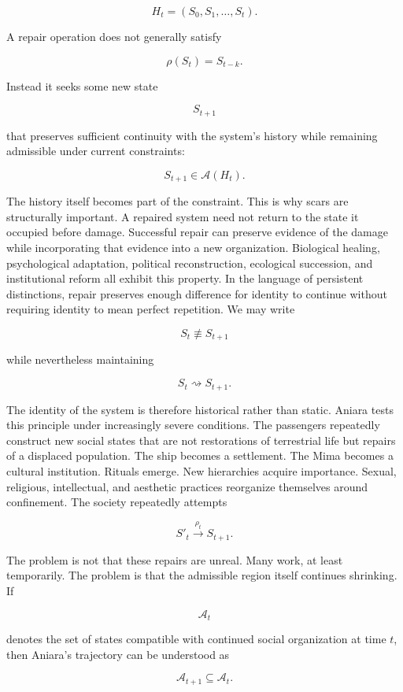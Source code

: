 \documentclass[11pt,oneside]{book}
\theoremstyle{definition}
\theoremstyle{remark}
\begin{document}
\[
H_t=(S_0,S_1,\ldots,S_t).
\]

A repair operation does not generally satisfy

\[
\rho(S_t)=S_{t-k}.
\]

Instead it seeks some new state

\[
S_{t+1}
\]

that preserves sufficient continuity with the system's history while remaining admissible under
current constraints:

\[
S_{t+1}\in \mathcal{A}(H_t).
\]

The history itself becomes part of the constraint. This is why scars are structurally important. A
repaired system need not return to the state it occupied before damage. Successful repair can
preserve evidence of the damage while incorporating that evidence into a new organization.
Biological healing, psychological adaptation, political reconstruction, ecological succession, and
institutional reform all exhibit this property. In the language of persistent distinctions, repair
preserves enough difference for identity to continue without requiring identity to mean perfect
repetition. We may write

\[
S_t\not\equiv S_{t+1}
\]

while nevertheless maintaining

\[
S_t\rightsquigarrow S_{t+1}.
\]

The identity of the system is therefore historical rather than static. Aniara tests this principle
under increasingly severe conditions. The passengers repeatedly construct new social states that are
not restorations of terrestrial life but repairs of a displaced population. The ship becomes a
settlement. The Mima becomes a cultural institution. Rituals emerge. New hierarchies acquire
importance. Sexual, religious, intellectual, and aesthetic practices reorganize themselves around
confinement. The society repeatedly attempts

\[
S'_t\xrightarrow{\rho_t}S_{t+1}.
\]

The problem is not that these repairs are unreal. Many work, at least temporarily. The problem is
that the admissible region itself continues shrinking. If

\[
\mathcal{A}_t
\]

denotes the set of states compatible with continued social organization at time \(t\), then Aniara's
trajectory can be understood as

\[
\mathcal{A}_{t+1} \subseteq \mathcal{A}_t.
\]
\end{document}
